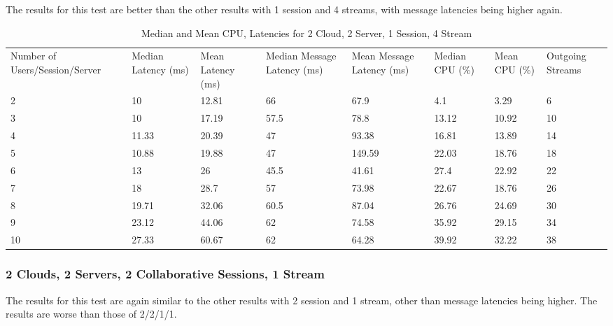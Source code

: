 The results for this test are better than the other results with 1 session and 4 streams, with message latencies being higher again.

\begin{table}
\caption{Median and Mean CPU, Latencies for 2 Cloud, 2 Server, 1 Session, 4 Stream}
\label{table:2cld_2serv_1sess_4str}
\begin{tabu} to\linewidth{|X[c]|X[c]|X[c]|X[c]|X[c]|X[c]|X[c]|X[c]|}
\everyrow{\hline}
\hline
Number of Users/Session/Server & Median Latency (ms) & Mean Latency (ms) & Median Message Latency (ms) & Mean Message Latency (ms) & Median CPU (\%) & Mean CPU (\%) & Outgoing Streams\\
2 & 10 & 12.81 & 66 & 67.9 & 4.1 & 3.29 & 6 \\
3 & 10 & 17.19 & 57.5 & 78.8 & 13.12 & 10.92 & 10 \\
4 & 11.33 & 20.39 & 47 & 93.38 & 16.81 & 13.89 & 14 \\
5 & 10.88 & 19.88 & 47 & 149.59 & 22.03 & 18.76 & 18 \\
6 & 13 & 26 & 45.5 & 41.61 & 27.4 & 22.92 & 22 \\
7 & 18 & 28.7 & 57 & 73.98 & 22.67 & 18.76 & 26 \\
8 & 19.71 & 32.06 & 60.5 & 87.04 & 26.76 & 24.69 & 30 \\
9 & 23.12 & 44.06 & 62 & 74.58 & 35.92 & 29.15 & 34 \\
10 & 27.33 & 60.67 & 62 & 64.28 & 39.92 & 32.22 & 38 \\
\end{tabu}
\end{table}

\clearpage\subsubsection{2 Clouds, 2 Servers, 2 Collaborative Sessions, 1 Stream}

The results for this test are again similar to the other results with 2 session and 1 stream, other than message latencies being higher. The results are worse than those of 2/2/1/1.

